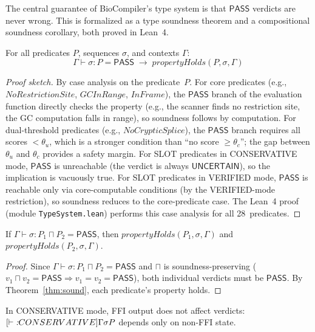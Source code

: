 \documentclass[acmsmall,review,anonymous]{acmart}
\newcommand{\PASS}{\ensuremath{\mathsf{PASS}}\xspace}
\newcommand{\UNCERTAIN}{\ensuremath{\mathsf{UNCERTAIN}}\xspace}
\newcommand{\seq}{\sigma}
\newcommand{\pred}{P}
\newcommand{\judg}[3]{#1 \vdash #2 : #3}
\begin{document}
The central guarantee of BioCompiler's type system is that \PASS{}
verdicts are never wrong.
This is formalized as a type soundness theorem and a compositional
soundness corollary, both proved in Lean~4.

\begin{theorem}\label{thm:sound}
For all predicates $\pred$, sequences $\seq$, and contexts $\Gamma$:
\[
  \judg{\Gamma}{\seq}{\pred} = \PASS
  \;\longrightarrow\;
  \mathit{propertyHolds}(\pred, \seq, \Gamma)
\]
\end{theorem}

\begin{proof}[Proof sketch]
By case analysis on the predicate~$\pred$.
For core predicates (e.g., $\mathit{NoRestrictionSite}$,
$\mathit{GCInRange}$, $\mathit{InFrame}$), the \PASS{} branch of
the evaluation function directly checks the property (e.g., the
scanner finds no restriction site, the GC computation falls in range),
so soundness follows by computation.
For dual-threshold predicates (e.g., $\mathit{NoCrypticSplice}$),
the \PASS{} branch requires all scores $< \theta_u$, which is a
stronger condition than ``no score $\ge \theta_c$''; the gap between
$\theta_u$ and $\theta_c$ provides a safety margin.
For SLOT predicates in CONSERVATIVE mode, \PASS{} is unreachable
(the verdict is always \UNCERTAIN{}), so the implication is vacuously
true.
For SLOT predicates in VERIFIED mode, \PASS{} is reachable only via
core-computable conditions (by the VERIFIED-mode restriction), so
soundness reduces to the core-predicate case.
The Lean~4 proof (module \texttt{TypeSystem.lean}) performs this case
analysis for all 28~predicates.
\end{proof}

\begin{corollary}\label{cor:comp}
If\/ $\judg{\Gamma}{\seq}{\pred_1 \sqcap \pred_2} = \PASS$, then
$\mathit{propertyHolds}(\pred_1, \seq, \Gamma)$ and
$\mathit{propertyHolds}(\pred_2, \seq, \Gamma)$.
\end{corollary}

\begin{proof}
Since $\judg{\Gamma}{\seq}{\pred_1 \sqcap \pred_2} = \PASS$ and
$\sqcap$ is soundness-preserving ($v_1 \sqcap v_2 = \PASS \Rightarrow
v_1 = v_2 = \PASS$), both individual verdicts must be \PASS.
By Theorem~\ref{thm:sound}, each predicate's property holds.
\end{proof}

\begin{corollary}\label{cor:slot}
In CONSERVATIVE mode, FFI output does not affect verdicts:
$\judg[\textit{CONSERVATIVE}]{\Gamma}{\seq}{\pred}$ depends only on
non-FFI state.
\end{corollary}
\end{document}
